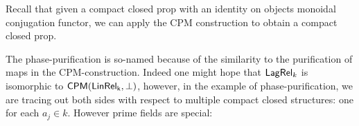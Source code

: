 %

Recall that given a compact closed prop with an identity on objects monoidal conjugation functor, we can apply the CPM construction to obtain a compact closed prop.

The phase-purification is so-named because of the similarity to the purification of maps in the CPM-construction.  Indeed one might hope that $\mathsf{Lag}\mathsf{Rel}_k$ is isomorphic to $\mathsf{CPM}(\sf LinRel_k,\perp)$, however, in the example of phase-purification, we are tracing out both sides with respect to multiple compact closed structures:  one for each $a_j \in k$.  However prime fields are special:



